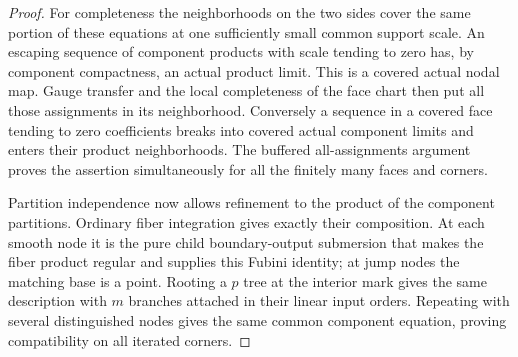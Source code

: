 \documentclass[11pt]{article}
\theoremstyle{definition}
\theoremstyle{remark}
\numberwithin{equation}{section}
\begin{document}
\begin{proof}
For completeness the neighborhoods on the two sides cover the same
portion of these equations at one sufficiently small common support
scale.  An escaping sequence of component products with scale tending
to zero has, by component compactness, an actual product limit.  This
is a covered actual nodal map.  Gauge transfer and the local completeness
of the face chart then put all those assignments in its neighborhood.
Conversely a sequence in a covered face tending to zero coefficients
breaks into covered actual component limits and enters their product
neighborhoods.  The buffered all-assignments argument proves the
assertion simultaneously for all the finitely many faces and corners.

Partition independence now allows refinement to the product of the
component partitions.  Ordinary fiber integration gives exactly their
composition.  At each smooth node it is the pure child boundary-output
submersion that makes the fiber product regular and supplies this Fubini
identity; at jump nodes the matching base is a point.  Rooting a $p$
tree at the interior mark gives the same description with $m$ branches
attached in their linear input orders.  Repeating with several
distinguished nodes gives the same common component equation, proving
compatibility on all iterated corners.
\end{proof}
\end{document}
